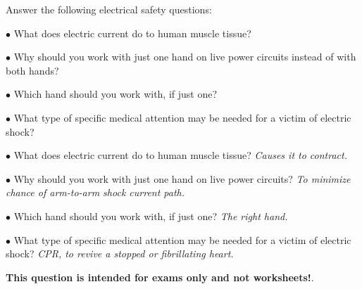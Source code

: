 

\noindent
Answer the following electrical safety questions:

\medskip
\item{$\bullet$} What does electric current do to human muscle tissue?
\vskip 15pt
\item{$\bullet$} Why should you work with just one hand on live power circuits instead of with both hands?
\vskip 15pt
\item{$\bullet$} Which hand should you work with, if just one?
\vskip 15pt
\item{$\bullet$} What type of specific medical attention may be needed for a victim of electric shock?
\medskip







\medskip
\item{$\bullet$} What does electric current do to human muscle tissue?  {\it Causes it to contract.}
\vskip 10pt
\item{$\bullet$} Why should you work with just one hand on live power circuits?  {\it To minimize chance of arm-to-arm shock current path.}
\vskip 10pt
\item{$\bullet$} Which hand should you work with, if just one?  {\it The right hand.}
\vskip 10pt
\item{$\bullet$} What type of specific medical attention may be needed for a victim of electric shock?  {\it CPR, to revive a stopped or fibrillating heart.}
\medskip







{\bf This question is intended for exams only and not worksheets!}.



